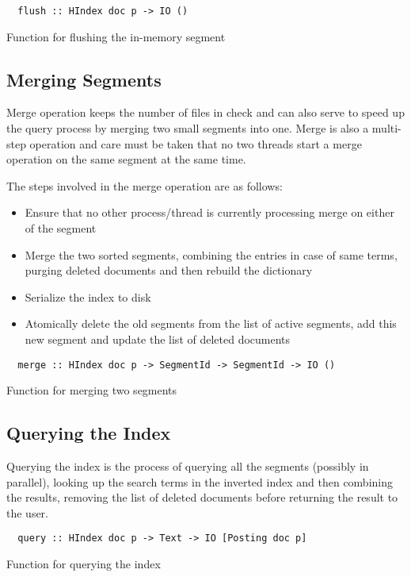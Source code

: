 \begin{listing}
\begin{verbatim}
  flush :: HIndex doc p -> IO ()
\end{verbatim}
\caption{Function for flushing the in-memory segment}
\end{listing}

\subsection{Merging Segments}
Merge operation keeps the number of files in check and can also serve to speed up the query process by merging two small segments into one.
Merge is also a multi-step operation and care must be taken that no two threads start a merge operation on the same segment at the same time.

The steps involved in the merge operation are as follows:
\begin{itemize}
\item Ensure that no other process/thread is currently processing merge on either of the segment
\item Merge the two sorted segments, combining the entries in case of same terms, purging deleted documents and then rebuild the dictionary
\item Serialize the index to disk
\item Atomically delete the old segments from the list of active segments, add this new segment and update the list of deleted documents
\end{itemize}

\begin{listing}
\begin{verbatim}
  merge :: HIndex doc p -> SegmentId -> SegmentId -> IO ()
\end{verbatim}
\caption{Function for merging two segments}
\end{listing}

\subsection{Querying the Index}
Querying the index is the process of querying all the segments (possibly in parallel), looking up the search terms in the inverted index and then
combining the results, removing the list of deleted documents before returning the result to the user.

\begin{listing}
\begin{verbatim}
  query :: HIndex doc p -> Text -> IO [Posting doc p]
\end{verbatim}
\caption{Function for querying the index}
\end{listing}


